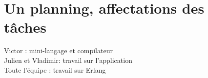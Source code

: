 \documentclass[a4paper]{article}
\begin{document}
\section{Un planning, affectations des tâches}
Victor : mini-langage et compilateur\\
Julien et Vladimir: travail sur l’application\\
Toute l’équipe : travail sur Erlang\\


\end{document}
